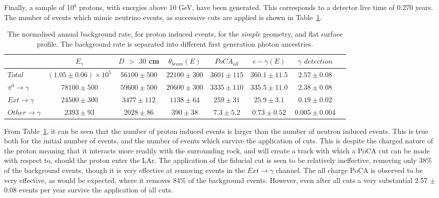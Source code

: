Finally, a sample of 10$^{8}$ protons, with energies above 10 GeV, have been generated. This corresponds to a detector live time of 0.270 years. The number of events which mimic neutrino events, as successive cuts are applied is shown in Table~\ref{tab:SurfProSimp}. \\

\begin{table}[h!]
  \caption[The normalised annual background rate, for proton induced events, for the \emph{simple} geometry, and flat surface profile]
          {The normalised annual background rate, for proton induced events, for the \emph{simple} geometry, and flat surface profile. The background rate is separated into different first generation photon ancestries.}
  \label{tab:SurfProSimp}
  \centering
  \scriptsize
  \begin{tabular}{l c c c c c c c }
    \toprule
        & $E_\gamma$ &  $D$ $>$ $30$ cm & $\theta_{beam}(E)$ & $PoCA_{all}$ & $e-\gamma(E)$ & $\gamma$ $detection$ \\
        \midrule
        $Total$          & $(1.05\pm0.06)\times10^{5}$ & $56100\pm500$ & $22100\pm300$ & $3601\pm115$ & $360.1\pm11.5$ & $2.57\pm0.08$ \\

        $\pi^0\to\gamma$ & $78100\pm500$               & $59600\pm500$ & $20600\pm300$ & $3335\pm110$ & $335.5\pm11.0$ & $2.38\pm0.08$ \\

        $Ext\to\gamma$   & $24500\pm300$               & $3477\pm112$  & $1138\pm64$   & $259\pm31$   & $25.9\pm3.1$   & $0.19\pm0.02$ \\

        $Other\to\gamma$ & $2393\pm93$                 & $2028\pm86$   & $390\pm38$    & $7.3\pm5.2$  & $0.73\pm0.52$  & $0.005\pm0.004$ \\
        \bottomrule
  \end{tabular}
\end{table}

From Table~\ref{tab:SurfProSimp}, it can be seen that the number of proton induced events is larger than the number of neutron induced events. This is true both for the initial number of events, and the number of events which survive the application of cuts. This is despite the charged nature of the proton meaning that it interacts more readily with the surrounding rock, and will create a track with which a PoCA cut can be made with respect to, should the proton enter the LAr. The application of the fiducial cut is seen to be relatively ineffective, removing only 38\% of the background events, though it is very effective at removing events in the $Ext\to\gamma$ channel. The all charge PoCA is observed to be very effective, as would be expected, where it removes 84\% of the background events. However, even after all cuts a very substantial 2.57 $\pm$ 0.08 events per year survive the application of all cuts. \\

